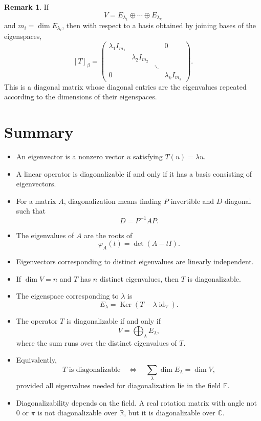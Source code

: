 \documentclass[11pt]{article}
\newcommand{\F}{\mathbb F}
\newcommand{\R}{\mathbb R}
\newcommand{\C}{\mathbb C}
\newcommand{\id}{\operatorname{id}}
\newcommand{\Ker}{\operatorname{Ker}}
\theoremstyle{definition}
\newtheorem{remark}[definition]{Remark}
\theoremstyle{plain}
\begin{document}
\begin{remark}
If
\[
V=E_{\lambda_1}\oplus\cdots\oplus E_{\lambda_k}
\]
and $m_i=\dim E_{\lambda_i}$, then with respect to a basis obtained by joining bases of the eigenspaces,
\[
[T]_{\beta}
=\begin{pmatrix}
\lambda_1 I_{m_1}&&&0\\
&\lambda_2 I_{m_2}&&\\
&&\ddots&\\
0&&&\lambda_k I_{m_k}
\end{pmatrix}.
\]
This is a diagonal matrix whose diagonal entries are the eigenvalues repeated according to the dimensions of their eigenspaces.
\end{remark}

\section{Summary}

\begin{itemize}
\item An eigenvector is a nonzero vector $u$ satisfying $T(u)=\lambda u$.
\item A linear operator is diagonalizable if and only if it has a basis consisting of eigenvectors.
\item For a matrix $A$, diagonalization means finding $P$ invertible and $D$ diagonal such that
\[
D=P^{-1}AP.
\]
\item The eigenvalues of $A$ are the roots of
\[
\varphi_A(t)=\det(A-tI).
\]
\item Eigenvectors corresponding to distinct eigenvalues are linearly independent.
\item If $\dim V=n$ and $T$ has $n$ distinct eigenvalues, then $T$ is diagonalizable.
\item The eigenspace corresponding to $\lambda$ is
\[
E_\lambda=\Ker(T-\lambda\id_V).
\]
\item The operator $T$ is diagonalizable if and only if
\[
V=\bigoplus_{\lambda} E_\lambda,
\]
where the sum runs over the distinct eigenvalues of $T$.
\item Equivalently,
\[
T\text{ is diagonalizable}
\quad\Longleftrightarrow\quad
\sum_{\lambda}\dim E_\lambda=\dim V,
\]
provided all eigenvalues needed for diagonalization lie in the field $\F$.
\item Diagonalizability depends on the field.  A real rotation matrix with angle not $0$ or $\pi$ is not diagonalizable over $\R$, but it is diagonalizable over $\C$.
\end{itemize}
\end{document}
